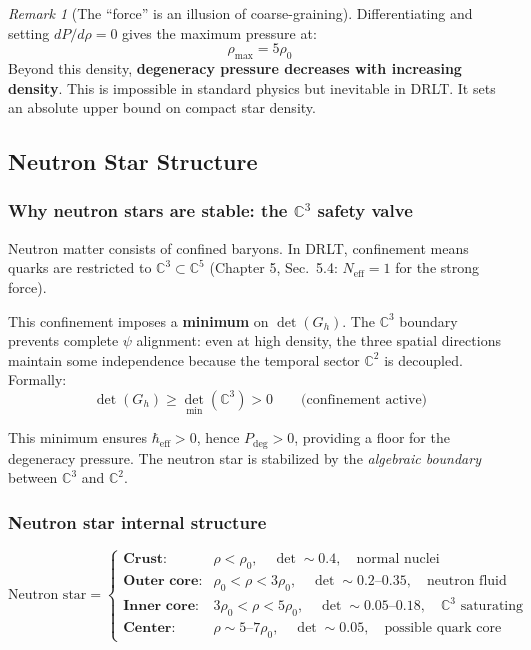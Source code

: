 \documentclass[12pt]{article}
\theoremstyle{remark}
\newtheorem{remark}[theorem]{Remark}
\theoremstyle{definition}
\newcommand{\CC}{\mathbb{C}}
\begin{document}
\begin{remark}[The ``force'' is an illusion of coarse-graining]
Differentiating and setting $dP/d\rho = 0$ gives the maximum pressure at:
\begin{equation}
\rho_\text{max} = 5\rho_0
\end{equation}
Beyond this density, \textbf{degeneracy pressure decreases with increasing density}. This is impossible in standard physics but inevitable in DRLT. It sets an absolute upper bound on compact star density.

\subsection{Neutron Star Structure}

\subsubsection{Why neutron stars are stable: the $\CC^3$ safety valve}

Neutron matter consists of confined baryons. In DRLT, confinement means quarks are restricted to $\CC^3 \subset \CC^5$ (Chapter 5, Sec.~5.4: $N_\text{eff} = 1$ for the strong force).

This confinement imposes a \textbf{minimum} on $\det(G_h)$. The $\CC^3$ boundary prevents complete $\psi$ alignment: even at high density, the three spatial directions maintain some independence because the temporal sector $\CC^2$ is decoupled. Formally:
\begin{equation}
\det(G_h) \geq \det_\text{min}(\CC^3) > 0 \qquad \text{(confinement active)}
\end{equation}

This minimum ensures $\hbar_\text{eff} > 0$, hence $P_\text{deg} > 0$, providing a floor for the degeneracy pressure. The neutron star is stabilized by the \emph{algebraic boundary} between $\CC^3$ and $\CC^2$.

\subsubsection{Neutron star internal structure}

\begin{equation}
\text{Neutron star} = \begin{cases}
\textbf{Crust:} & \rho < \rho_0, \quad \det \sim 0.4, \quad \text{normal nuclei} \\
\textbf{Outer core:} & \rho_0 < \rho < 3\rho_0, \quad \det \sim 0.2\text{--}0.35, \quad \text{neutron fluid} \\
\textbf{Inner core:} & 3\rho_0 < \rho < 5\rho_0, \quad \det \sim 0.05\text{--}0.18, \quad \text{$\CC^3$ saturating} \\
\textbf{Center:} & \rho \sim 5\text{--}7\rho_0, \quad \det \sim 0.05, \quad \text{possible quark core}
\end{cases}
\end{equation}


\end{remark}
\end{document}
